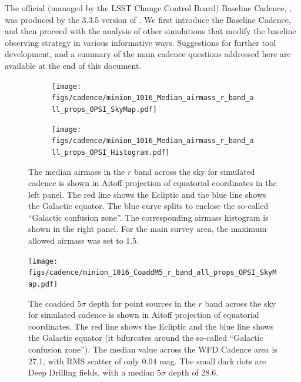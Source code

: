 The official (managed by the LSST Change Control Board)
Baseline Cadence, , was produced by the 3.3.5 version of
\OpSim. We first introduce the Baseline Cadence,
and then proceed with the analysis of other simulations that modify the baseline
observing strategy in various informative ways. Suggestions for
further tool development, and a summary of the main cadence questions
addressed here are available at the end of this document.





\begin{figure}[tbh!]
\begin{subfigure}[b]{0.49\textwidth}
\texttt{[image: figs/cadence/minion\_1016\_Median\_airmass\_r\_band\_all\_props\_OPSI\_SkyMap.pdf]}
\end{subfigure}
\hfill
\begin{subfigure}[b]{0.49\textwidth}
\texttt{[image: figs/cadence/minion\_1016\_Median\_airmass\_r\_band\_all\_props\_OPSI\_Histogram.pdf]}
\end{subfigure}
\caption{The median airmass in the $r$ band across the sky for simulated cadence
 is shown in Aitoff projection of equatorial coordinates
in the left panel. The red line shows the Ecliptic and the blue line shows the Galactic
equator. The blue curve splits to enclose the so-called ``Galactic confusion zone''. The corresponding
airmass histogram is shown in the right panel. For the main survey area, the maximum
allowed airmass was set to 1.5. }
\label{fig:airmassenigma}
\end{figure}

\begin{figure}[t!]
\vskip -0.1in
\texttt{[image: figs/cadence/minion\_1016\_CoaddM5\_r\_band\_all\_props\_OPSI\_SkyMap.pdf]}
\vskip -0.5in
\caption{The coadded $5\sigma$ depth for point sources in the $r$ band
across the sky for simulated cadence  is shown
in Aitoff projection of equatorial coordinates. The red line shows the Ecliptic and
the blue line shows the Galactic equator (it bifurcates around the so-called
``Galactic confusion zone''). The median value across the WFD Cadence area
is 27.1, with RMS scatter of only 0.04 mag. The small dark dots are Deep Drilling
fields, with a median $5\sigma$ depth of 28.6.}
\label{fig:coaddm5enigma}
\end{figure}

